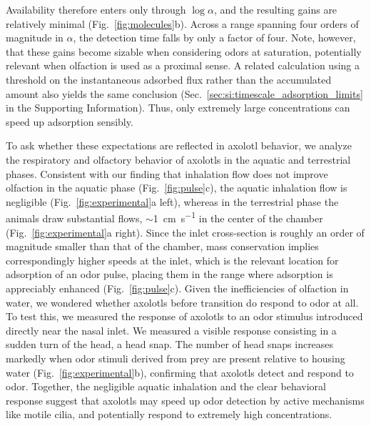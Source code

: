 \documentclass[%
 twocolumn,
 amsmath,amssymb,
 aps,prfluids,
 superscriptaddress,
]{revtex4-2}
\begin{document}
Availability therefore enters only through $\log\alpha$, and the resulting gains are relatively minimal (Fig.~\ref{fig:molecules}b). Across a range spanning four orders of magnitude in $\alpha$, the detection time falls by only a factor of four. Note, however, that these gains become sizable when considering odors at saturation, potentially relevant when olfaction is used as a proximal sense. 
A related calculation using a threshold on the instantaneous adsorbed flux rather than the accumulated amount also yields the same conclusion (Sec.~\ref{sec:si:timescale_adsorption_limits} in the Supporting Information). Thus, only extremely large concentrations can speed up adsorption sensibly.

To ask whether these expectations are reflected in axolotl behavior, we analyze the respiratory and olfactory behavior of axolotls in the aquatic and terrestrial phases. Consistent with our finding that inhalation flow does not improve olfaction in the aquatic phase (Fig.~\ref{fig:pulse}c), the aquatic inhalation flow is negligible (Fig.~\ref{fig:experimental}a left), whereas in the terrestrial phase the animals draw substantial flows, $\sim$\SI{1}{\centi\meter\per\second} in the center of the chamber (Fig.~\ref{fig:experimental}a right). Since the inlet cross-section is roughly an order of magnitude smaller than that of the chamber, mass conservation implies correspondingly higher speeds at the inlet, which is the relevant location for adsorption of an odor pulse, placing them in the range where adsorption is appreciably enhanced (Fig.~\ref{fig:pulse}c). Given the inefficiencies of olfaction in water, we wondered whether axolotls before transition do respond to odor at all. To test this, we measured the response of axolotls to an odor stimulus introduced directly near the nasal inlet. We measured a visible response consisting in a sudden turn of the head, a head snap. The number of head snaps increases markedly when  odor stimuli derived from prey are present relative to housing water (Fig.~\ref{fig:experimental}b), confirming that axolotls detect and respond to odor.  Together, the negligible aquatic inhalation and the clear behavioral response suggest that axolotls may speed up odor detection by active mechanisms like motile cilia, and potentially respond to extremely high concentrations. 
\end{document}
